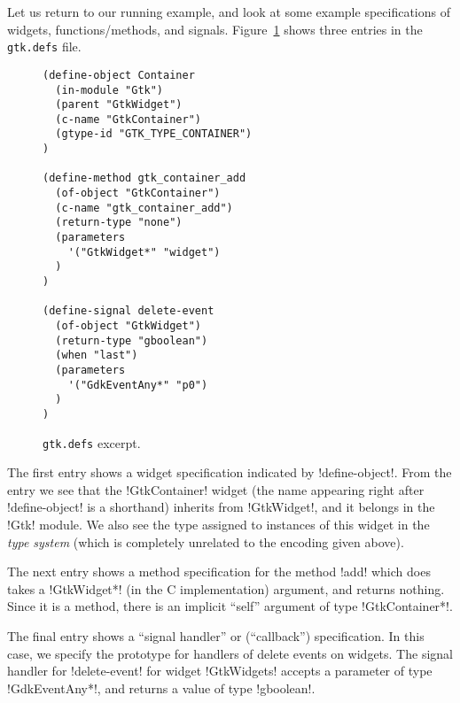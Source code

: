 \documentclass[workingdraft]{usetex-v1}
\begin{document}
Let us return to our running example, and look at some example
specifications of widgets, functions/methods, and signals.
Figure~\ref{fig:gtk-defs} shows three entries in the \texttt{gtk.defs}
file.
\begin{figure}[htbp]
\begin{centering}
\begin{verbatim}
(define-object Container
  (in-module "Gtk")
  (parent "GtkWidget")
  (c-name "GtkContainer")
  (gtype-id "GTK_TYPE_CONTAINER")
)

(define-method gtk_container_add
  (of-object "GtkContainer")
  (c-name "gtk_container_add")
  (return-type "none")
  (parameters
    '("GtkWidget*" "widget")
  )
)

(define-signal delete-event
  (of-object "GtkWidget")
  (return-type "gboolean")
  (when "last")
  (parameters
    '("GdkEventAny*" "p0")
  )
)
\end{verbatim}
\caption{\texttt{gtk.defs} excerpt.\label{fig:gtk-defs}}
\end{centering}
\end{figure}
The first entry shows a widget specification indicated by
!define-object!. From the entry we see that the !GtkContainer! widget
(the name appearing right after !define-object! is a shorthand)
inherits from !GtkWidget!, and it belongs in the !Gtk! module.  We also
see the type assigned to instances of this widget in the \emph{\gtk type
system} (which is completely unrelated to the \sml encoding given
above).

The next entry shows a method specification for the method !add!
which does takes a !GtkWidget*! (in the C implementation)
argument, and returns nothing. Since it is a method, there is an
implicit ``self'' argument of type !GtkContainer*!.

The final entry shows a ``signal handler'' or (``callback'')
specification. In this case, we specify the prototype for handlers of
delete events on widgets. The signal handler for !delete-event! for
widget !GtkWidgets! accepts a parameter of type !GdkEventAny*!, and
returns a value of type !gboolean!. 



\end{document}

